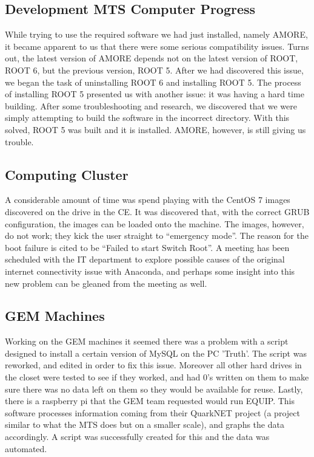 \documentclass[12pt]{article}
\newcommand\tab[1][1cm]{\hspace*{#1}}
\begin{document}
\subsection{Development MTS Computer Progress}

\tab While trying to use the required software we had just installed, namely
AMORE, it became apparent to us that there were some serious compatibility
issues. Turns out, the latest version of AMORE depends not on the latest version
of ROOT, ROOT 6, but the previous version, ROOT 5. After we had discovered this
issue, we began the task of uninstalling ROOT 6 and installing ROOT 5. The
process of installing ROOT 5 presented us with another issue: it was having a
hard time building. After some troubleshooting and research, we discovered that
we were simply attempting to build the software in the incorrect directory. With
this solved, ROOT 5 was built and it is installed. AMORE, however, is still
giving us trouble.

\subsection{Computing Cluster}

\tab A considerable amount of time was spend playing with the CentOS 7 images
discovered on the drive in the CE. It was discovered that, with the correct GRUB
configuration, the images can be loaded onto the machine. The images, however,
do not work; they kick the user straight to ``emergency mode''. The reason for
the boot failure is cited to be ``Failed to start Switch Root''. A meeting has
been scheduled with the IT department to explore possible causes of the original
internet connectivity issue with Anaconda, and perhaps some insight into this
new problem can be gleaned from the meeting as well.

\subsection{GEM Machines}
\tab Working on the GEM machines it seemed there was a problem with a script designed to install a certain version of MySQL on the PC 'Truth'. The script was reworked, and edited in order to fix this issue. Moreover all other hard drives in the closet were tested to see if they worked, and had 0's written on them to make sure there was no data left on them so they would be available for reuse. Lastly, there is a raspberry pi that the GEM team requested would run EQUIP. This software processes information coming from their QuarkNET project (a project similar to what the MTS does but on a smaller scale), and graphs the data accordingly. A script was successfully created for this and the data was automated.
\end{document}
